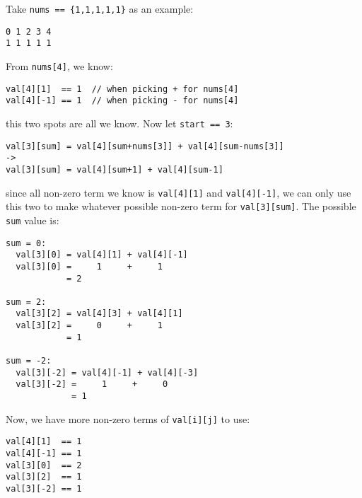 \documentclass[12pt]{article}
\begin{document}
Take \texttt{nums == \{1,1,1,1,1\}} as an example:
\begin{verbatim}
0 1 2 3 4
1 1 1 1 1
\end{verbatim}
From \texttt{nums[4]}, we know:
\begin{verbatim}
val[4][1]  == 1  // when picking + for nums[4]
val[4][-1] == 1  // when picking - for nums[4]
\end{verbatim}
this two spots are all we know. Now let \texttt{start == 3}:
\begin{verbatim}
val[3][sum] = val[4][sum+nums[3]] + val[4][sum-nums[3]]
->
val[3][sum] = val[4][sum+1] + val[4][sum-1]
\end{verbatim}
since all non-zero term we know is \texttt{val[4][1]} and \texttt{val[4][-1]}, we can only use this two to make whatever possible non-zero term for \texttt{val[3][sum]}. The possible \texttt{sum} value is:
\begin{verbatim}
sum = 0:
  val[3][0] = val[4][1] + val[4][-1]
  val[3][0] =     1     +     1
            = 2

sum = 2:
  val[3][2] = val[4][3] + val[4][1]
  val[3][2] =     0     +     1
            = 1

sum = -2:
  val[3][-2] = val[4][-1] + val[4][-3]
  val[3][-2] =     1     +     0
             = 1            
\end{verbatim}

Now, we have more non-zero terms of \texttt{val[i][j]} to use:
\begin{verbatim}
val[4][1]  == 1
val[4][-1] == 1
val[3][0]  == 2
val[3][2]  == 1
val[3][-2] == 1
\end{verbatim}
\end{document}
